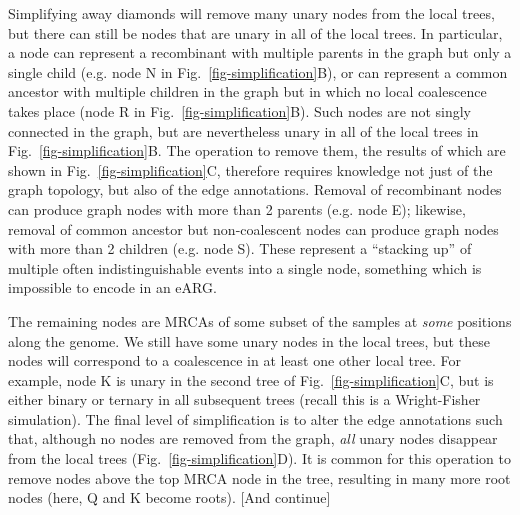 \documentclass{article}
\begin{document}
Simplifying away diamonds will remove many unary nodes from the
local trees, but there can still be nodes that are unary in all
of the local trees. In particular, a node can represent a recombinant
with multiple parents in the graph but only a single child (e.g. node \textsf{N}
in Fig.~\ref{fig-simplification}B), or can represent a common ancestor with
multiple children in the graph but in which no local coalescence takes place
(node \textsf{R} in Fig.~\ref{fig-simplification}B).
Such nodes are not singly connected in the graph, but are nevertheless unary in
all of the local trees in Fig.~\ref{fig-simplification}B. The operation to remove them,
the results of which are shown in Fig.~\ref{fig-simplification}C,
therefore requires knowledge not just of the graph topology, but also of the
edge annotations. Removal of recombinant nodes can produce graph nodes with
more than 2 parents (e.g. node \textsf{E}); likewise, removal of
common ancestor but non-coalescent nodes can produce graph nodes with
more than 2 children (e.g. node \textsf{S}). These represent a ``stacking up'' of multiple
often indistinguishable events into a single node, something which is impossible
to encode in an eARG.

The remaining nodes are MRCAs of some subset of the samples
at \emph{some} positions along the genome. We still have
some unary nodes in the local trees, but these nodes will
correspond to a coalescence in at least one other
local tree. For example, node  \textsf{K} is unary in the second tree
of Fig.~\ref{fig-simplification}C, but is either binary
or ternary in all subsequent trees (recall this is a Wright-Fisher
simulation). The final level of simplification is to alter the edge annotations
such that, although no nodes are removed from the graph, \emph{all}
unary nodes disappear from the local trees (Fig.~\ref{fig-simplification}D).
It is common for this operation to remove nodes above the top MRCA node
in the tree, resulting in many more root nodes (here, \textsf{Q} and \textsf{K}
become roots). [And continue]
\end{document}
